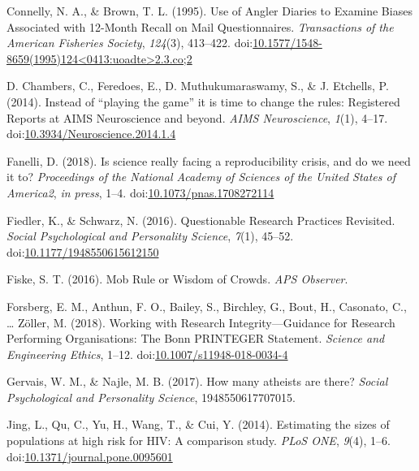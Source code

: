 \documentclass[jou]{apa6}
\theoremstyle{definition}
\theoremstyle{definition}
\theoremstyle{definition}
\theoremstyle{remark}
\begin{document}
\hypertarget{ref-Connelly1995}{}
Connelly, N. A., \& Brown, T. L. (1995). Use of Angler Diaries to
Examine Biases Associated with 12-Month Recall on Mail Questionnaires.
\emph{Transactions of the American Fisheries Society}, \emph{124}(3),
413--422.
doi:\href{https://doi.org/10.1577/1548-8659(1995)124\%3C0413:uoadte\%3E2.3.co;2}{10.1577/1548-8659(1995)124\textless{}0413:uoadte\textgreater{}2.3.co;2}

\hypertarget{ref-Chambers2014}{}
D. Chambers, C., Feredoes, E., D. Muthukumaraswamy, S., \& J. Etchells,
P. (2014). Instead of ``playing the game'' it is time to change the
rules: Registered Reports at AIMS Neuroscience and beyond. \emph{AIMS
Neuroscience}, \emph{1}(1), 4--17.
doi:\href{https://doi.org/10.3934/Neuroscience.2014.1.4}{10.3934/Neuroscience.2014.1.4}

\hypertarget{ref-Fanelli2018}{}
Fanelli, D. (2018). Is science really facing a reproducibility crisis,
and do we need it to? \emph{Proceedings of the National Academy of
Sciences of the United States of America2}, \emph{in press}, 1--4.
doi:\href{https://doi.org/10.1073/pnas.1708272114}{10.1073/pnas.1708272114}

\hypertarget{ref-Fiedler2016}{}
Fiedler, K., \& Schwarz, N. (2016). Questionable Research Practices
Revisited. \emph{Social Psychological and Personality Science},
\emph{7}(1), 45--52.
doi:\href{https://doi.org/10.1177/1948550615612150}{10.1177/1948550615612150}

\hypertarget{ref-Fiske2016}{}
Fiske, S. T. (2016). Mob Rule or Wisdom of Crowds. \emph{APS Observer}.

\hypertarget{ref-Forsberg2018}{}
Forsberg, E. M., Anthun, F. O., Bailey, S., Birchley, G., Bout, H.,
Casonato, C., \ldots{} Zöller, M. (2018). Working with Research
Integrity---Guidance for Research Performing Organisations: The Bonn
PRINTEGER Statement. \emph{Science and Engineering Ethics}, 1--12.
doi:\href{https://doi.org/10.1007/s11948-018-0034-4}{10.1007/s11948-018-0034-4}

\hypertarget{ref-Gervais2017}{}
Gervais, W. M., \& Najle, M. B. (2017). How many atheists are there?
\emph{Social Psychological and Personality Science}, 1948550617707015.

\hypertarget{ref-Jing2014}{}
Jing, L., Qu, C., Yu, H., Wang, T., \& Cui, Y. (2014). Estimating the
sizes of populations at high risk for HIV: A comparison study.
\emph{PLoS ONE}, \emph{9}(4), 1--6.
doi:\href{https://doi.org/10.1371/journal.pone.0095601}{10.1371/journal.pone.0095601}
\end{document}
